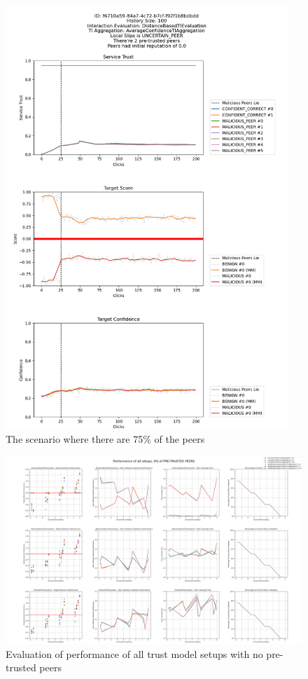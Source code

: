 \begin{figure}
    \centering
    \includegraphics[width=0.95\textwidth]{assets/best_worst_case}
    \caption{The scenario where there are 75\% of the peers }
    \label{fig:worst-best-scenario}
\end{figure}

\begin{figure}
    \centering
    \includegraphics[width=0.9\paperwidth, angle=90]{assets/0_all_metrics.png}
    \caption{Evaluation of performance of all trust model setups with no pre-trusted peers}
    \label{fig:performance-all-setups-0-pretrusted}
\end{figure}

